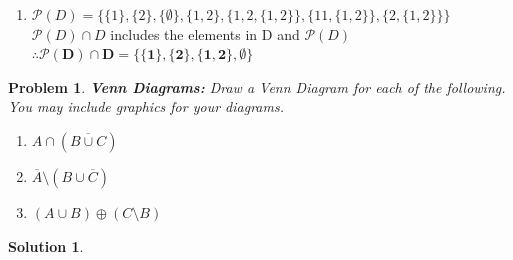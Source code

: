 \documentclass{article}
\newtheorem{problem}{Problem}
\theoremstyle{definition}
\newtheorem*{solution}{Solution}
\begin{document}
\begin{enumerate}[label = \alph*)]
    \item
    $\mathcal{P}(D) = \{\{1\}, \{2\}, \{\emptyset\}, \{1, 2\}, \{1, 2, \{1,2\}\}, \{11,\{1,2\}\}, \{2,\{1,2\}\}\}$\\
    $\mathcal{P}(D) \cap D$ includes the elements in D and $\mathcal{P}(D)$\\
    $\therefore \mathbf{\mathcal{P}(D) \cap D = \{\{1\}, \{2\}, \{1,2\}, \emptyset\}}$
\end{enumerate}

\begin{problem}
\textbf{Venn Diagrams:} Draw a Venn Diagram for each of the following. You may include graphics for your diagrams.
\begin{enumerate}[label = \alph*)]
    \item $A \cap (\overline{B \cup C})$
    
    \item $\overline{A} \setminus (B \cup \overline{C})$

    \item $(A \cup B) \oplus (C \setminus B)$
\end{enumerate}
\end{problem}

\begin{solution}
\end{solution}
\end{document}
